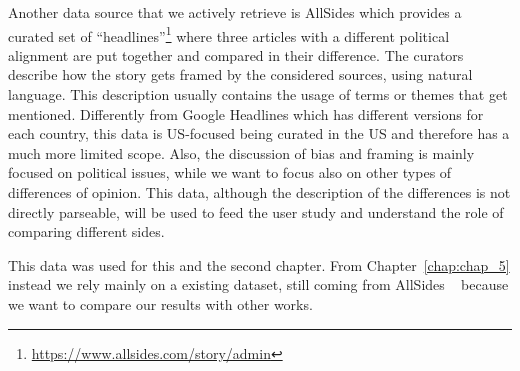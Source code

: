 Another data source that we actively retrieve is AllSides which provides a curated set of ``headlines''\footnote{\url{https://www.allsides.com/story/admin}} where three articles with a different political alignment are put together and compared in their difference.
The curators describe how the story gets framed by the considered sources, using natural language.
This description usually contains the usage of terms or themes that get mentioned.
Differently from Google Headlines which has different versions for each country, this data is US-focused being curated in the US and therefore has a much more limited scope. Also, the discussion of bias and framing is mainly focused on political issues, while we want to focus also on other types of differences of opinion.
This data, although the description of the differences is not directly parseable, will be used to feed the user study and understand the role of comparing different sides.



This data was used for this and the second chapter. From Chapter~\ref{chap:chap_5} instead we rely mainly on a existing dataset, still coming from AllSides ~\citep{baly-dataset} because we want to compare our results with other works.


